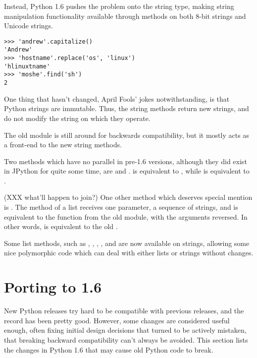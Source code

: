 \documentclass{howto}
\begin{document}
{Instead, Python 1.6 pushes the problem onto the string type, making
string manipulation functionality available through methods on both
8-bit strings and Unicode strings.  

\begin{verbatim}
>>> 'andrew'.capitalize()
'Andrew'
>>> 'hostname'.replace('os', 'linux')
'hlinuxtname'
>>> 'moshe'.find('sh')
2
\end{verbatim}

One thing that hasn't changed, April Fools' jokes notwithstanding, is
that Python strings are immutable. Thus, the string methods return new
strings, and do not modify the string on which they operate.

The old  module is still around for backwards
compatibility, but it mostly acts as a front-end to the new string
methods.

Two methods which have no parallel in pre-1.6 versions, although they
did exist in JPython for quite some time, are 
and .   is equivalent to , while  is equivalent to .

(XXX what'll happen to join?)  One other method which deserves special
mention is .  The  method of a list receives
one parameter, a sequence of strings, and is equivalent to the
 function from the old  module,
with the arguments reversed. In other words,  is
equivalent to the old .

Some list methods, such as , ,
, , and  are now available
on strings, allowing some nice polymorphic code which can deal with
either lists or strings without changes.

\section{Porting to 1.6}

New Python releases try hard to be compatible with previous releases,
and the record has been pretty good.  However, some changes are
considered useful enough, often fixing initial design decisions that
turned to be actively mistaken, that breaking backward compatibility
can't always be avoided.  This section lists the changes in Python 1.6
that may cause old Python code to break.

}
\end{document}
